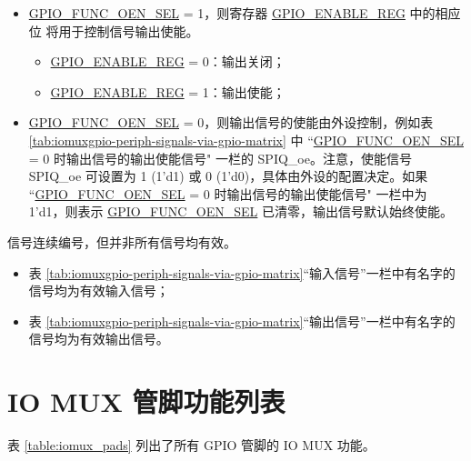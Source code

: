 \documentclass[main\_\_CN.tex]{subfiles}
\begin{document}
\begin{itemize}
    \item \hyperref[fielddesc:GPIOFUNCNOENSEL]{GPIO\_FUNC\_OEN\_SEL} = 1，则寄存器 \hyperref[regdesc:GPIOENABLEREG]{GPIO\_ENABLE\_REG} 中的相应位   将用于控制信号输出使能。
    \begin{itemize}
        \item \hyperref[regdesc:GPIOENABLEREG]{GPIO\_ENABLE\_REG} = 0：输出关闭；
        \item \hyperref[regdesc:GPIOENABLEREG]{GPIO\_ENABLE\_REG} = 1：输出使能；
    \end{itemize}
    \item \hyperref[fielddesc:GPIOFUNCNOENSEL]{GPIO\_FUNC\_OEN\_SEL} = 0，则输出信号的使能由外设控制，例如表 \ref{tab:iomuxgpio-periph-signals-via-gpio-matrix} 中 ``\hyperref[fielddesc:GPIOFUNCNOENSEL]{GPIO\_FUNC\_OEN\_SEL} = 0 时输出信号的输出使能信号" 一栏的 SPIQ\_oe。注意，使能信号 SPIQ\_oe 可设置为 1 (1'd1) 或 0 (1'd0)，具体由外设的配置决定。如果 ``\hyperref[fielddesc:GPIOFUNCNOENSEL]{GPIO\_FUNC\_OEN\_SEL} = 0 时输出信号的输出使能信号" 一栏中为 1'd1，则表示 \hyperref[fielddesc:GPIOFUNCNOENSEL]{GPIO\_FUNC\_OEN\_SEL} 已清零，输出信号默认始终使能。
\end{itemize}

\begin{tiplisting}
信号连续编号，但并非所有信号均有效。
\vspace{-1em}
\begin{itemize}
    \item 表 \ref{tab:iomuxgpio-periph-signals-via-gpio-matrix}“输入信号”一栏中有名字的信号均为有效输入信号；
    \item 表 \ref{tab:iomuxgpio-periph-signals-via-gpio-matrix}“输出信号”一栏中有名字的信号均为有效输出信号。
\end{itemize}
\end{tiplisting}

\begin{landscape}



\end{landscape}
\section{IO MUX 管脚功能列表}
\label{sec:iomux_pads}
表 \ref{table:iomux_pads} 列出了所有 GPIO 管脚的 IO MUX 功能。
\end{document}

